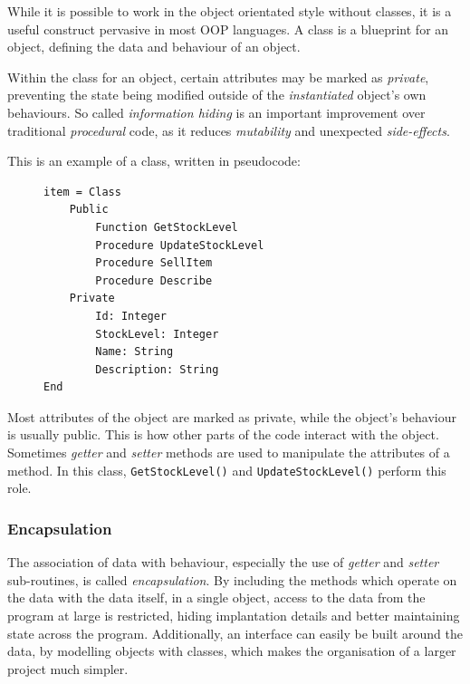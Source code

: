 \documentclass[10pt]{article}
\begin{document}
While it is possible to work in the object orientated style without classes, it is a useful construct pervasive in most OOP languages. A class is a blueprint for an object, defining the data and behaviour of an object.

Within the class for an object, certain attributes may be marked as \emph{private}, preventing the state being modified outside of the \emph{instantiated} object's own behaviours. So called \emph{information hiding} is an important improvement over traditional \emph{procedural} code, as it reduces \emph{mutability} and unexpected \emph{side-effects}.

This is an example of a class, written in pseudocode:

\begin{figure}[H]
\begin{verbatim}
item = Class
    Public
        Function GetStockLevel
        Procedure UpdateStockLevel
        Procedure SellItem
        Procedure Describe
    Private
        Id: Integer
        StockLevel: Integer
        Name: String
        Description: String
End
\end{verbatim}
\end{figure}

Most attributes of the object are marked as private, while the object's behaviour is usually public. This is how other parts of the code interact with the object. Sometimes \emph{getter} and \emph{setter} methods are used to manipulate the attributes of a method. In this class, \texttt{GetStockLevel()} and \texttt{UpdateStockLevel()} perform this role.

\subsubsection{Encapsulation}
\label{sec:orgc9ac8a2}

The association of data with behaviour, especially the use of \emph{getter} and \emph{setter} sub-routines, is called \emph{encapsulation}. By including the methods which operate on the data with the data itself, in a single object, access to the data from the program at large is restricted, hiding implantation details and better maintaining state across the program. Additionally, an interface can easily be built around the data, by modelling objects with classes, which makes the organisation of a larger project much simpler.
\end{document}
